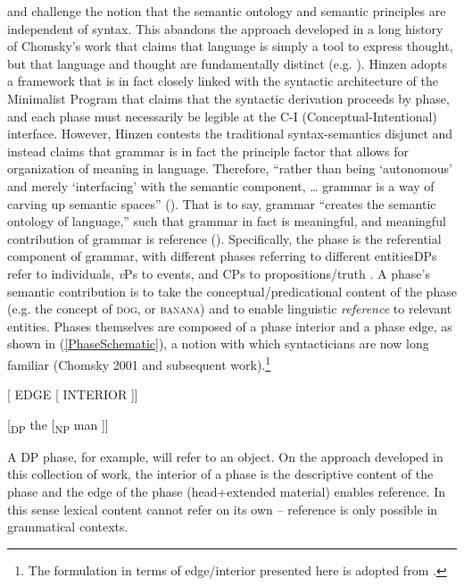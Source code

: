 \documentclass[output=paper
,modfonts
,nonflat
]{langsci/langscibook}
\begin{document}
\citet{Hinzen:2006, Hinzen:2012} and \citet{HinzenSheehan:2013} challenge the notion that the semantic ontology and semantic principles are independent of syntax. This abandons the approach developed in a long history of Chomsky’s work that claims that language is simply a tool to express thought, but that language and thought are fundamentally distinct (e.g. \citealt{Chomsky:2000b}). Hinzen adopts a framework that is in fact closely linked with the syntactic architecture of the Minimalist Program \citep{Chomsky:2000, Chomsky:2001a, Chomsky:2008} that claims that the syntactic derivation proceeds by phase, and each phase must necessarily be legible at the C-I (Conceptual-Intentional) interface. However, Hinzen contests the traditional syntax-semantics disjunct and instead claims that grammar is in fact the principle factor that allows for organization of meaning in language. Therefore, ``rather than being `autonomous' and merely `interfacing' with the semantic component, … grammar is a way of carving up semantic spaces'' (\citealt[311]{Hinzen:2012}).  That is to say, grammar ``creates the semantic ontology of language,'' such that grammar in fact is meaningful, and meaningful contribution of grammar is reference (\citealt[311]{Hinzen:2012}). Specifically, the phase is the referential component of grammar, with different phases referring to different entities\textemdash DPs refer to individuals, \textit{v}Ps to events, and CPs to propositions/truth \citep{HinzenSheehan:2013, SheehanHinzen:2011}.  
A phase's semantic contribution is to take the conceptual/predicational content of the phase (e.g. the concept of \textsc{dog}, or \textsc{banana}) and to enable linguistic \textit{reference} to relevant entities. Phases themselves are composed of a phase interior and a phase edge, as shown in (\ref{PhaseSchematic}), a notion with which syntacticians are now long familiar (Chomsky 2001 and subsequent work).\footnote{The formulation in terms of edge/interior presented here is adopted from \citet{HinzenSheehan:2013}.} 

\ea	 \label{PhaseSchematic}
{[} EDGE [ INTERIOR ]]
\z

\ea 
{[}\textsubscript{DP} the [\textsubscript{NP} man ]]
\z

\noindent A DP phase, for example, will refer to an object. On the approach developed in this collection of work, the interior of a phase is the descriptive content of the phase and the edge of the phase (head+extended material) enables reference. In this sense lexical content cannot refer on its own – reference is only possible in grammatical contexts. 
\end{document}
